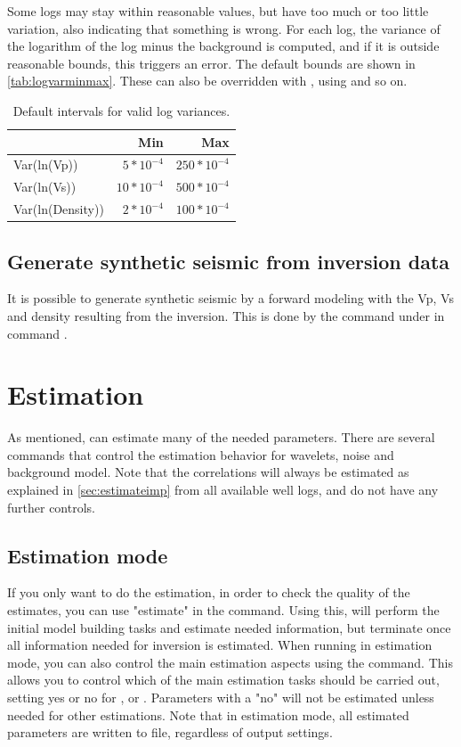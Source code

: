 Some logs may stay within reasonable values, but have too much or too little variation, also indicating that something is wrong. For each log, the variance of the logarithm of the log minus the background is computed, and if it is outside reasonable bounds, this triggers an error. The default bounds are shown in \autoref{tab:logvarminmax}. These can also be overridden with , using  and so on.
\begin{table}
\begin{tabular}{|lrr|}
\hline
& Min & Max \\
\hline
Var(ln(Vp)) & $5*10^{-4}$ & $250*10^{-4}$ \\
Var(ln(Vs)) & $10*10^{-4}$ & $500*10^{-4}$ \\
Var(ln(Density)) & $2*10^{-4}$ & $100*10^{-4}$ \\
\end{tabular}
\caption{Default intervals for valid log variances.\label{tab:logvarminmax}}
\end{table}

\subsection{Generate synthetic seismic from inversion data}
It is possible to generate synthetic seismic by a forward modeling with the Vp, Vs and density resulting from the inversion. This is done by the command   under  in command .

\section{Estimation}
\label{sec:estimateusr}
As mentioned, \crava can estimate many of the needed parameters. There are several commands that control the estimation behavior for wavelets, noise and background model. Note that the correlations will always be estimated as explained in \autoref{sec:estimateimp} from all available well logs, and do not have any further controls.

\subsection{Estimation mode}
If you only want to do the estimation, in order to check the quality of the estimates, you can use "estimate" in the  command. Using this, \crava will perform the initial model building tasks and estimate needed information, but terminate once all information needed for inversion is estimated. When running in estimation mode, you can also control the main estimation aspects using the  command. This allows you to control which of the main estimation tasks should be carried out, setting yes or no for ,  or . Parameters with a "no" will not be estimated unless needed for other estimations. Note that in estimation mode, all estimated parameters are written to file, regardless of output settings.
